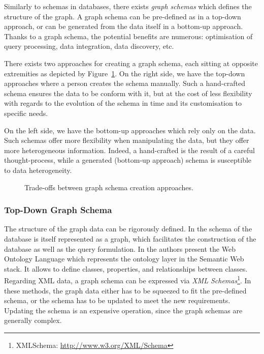 Similarly to schemas in databases, there exists \emph{graph schemas} which defines the structure of the graph. A graph schema can be pre-defined as in a top-down approach, or can be generated from the data itself in a bottom-up approach. Thanks to a graph schema, the potential benefits are numerous: optimisation of query processing, data integration, data discovery, etc.

There exists two approaches for creating a graph schema, each sitting at opposite extremities as depicted by Figure~\ref{fig:introduction:schema-tradeoffs}. On the right side, we have the top-down approaches where a person creates the schema manually. Such a hand-crafted schema ensures the data to be conform with it, but at the cost of less flexibility with regards to the evolution of the schema in time and its customisation to specific needs.

On the left side, we have the bottom-up approaches which rely only on the data. Such schemas offer more flexibility when manipulating the data, but they offer more heterogeneous information.
Indeed, a hand-crafted is the result of a careful thought-process, while a generated (bottom-up approach) schema is susceptible to data heterogeneity.

\begin{figure}
	\centering
	\resizebox{.6\textwidth}{!}{
		
	}
	\caption{Trade-offs between graph schema creation approaches.}
	\label{fig:introduction:schema-tradeoffs}
\end{figure}

\subsubsection{Top-Down Graph Schema}

The structure of the graph data can be rigorously defined. In \cite{kunii1983graph} the schema of the database is itself represented as a graph, which facilitates the construction of the database as well as the query formulation. In \cite{antoniou2004web} the authors present the Web Ontology Language which represents the ontology layer in the Semantic Web stack. It allows to define classes, properties, and relationships between classes. Regarding XML data, a graph schema can be expressed via \emph{XML Schemas}\footnote{XMLSchema: \url{http://www.w3.org/XML/Schema}}. In these methods, the graph data either has to be squeezed to fit the pre-defined schema, or the schema has to be updated to meet the new requirements. Updating the schema is an expensive operation, since the graph schemas are generally complex.

